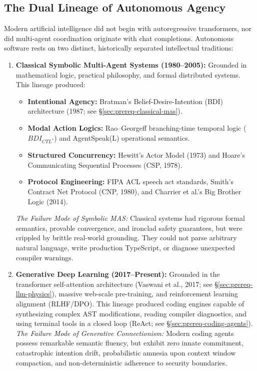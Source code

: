 \subsection{The Dual Lineage of Autonomous Agency}\label{sec:prereq-lineage}

Modern artificial intelligence did not begin with autoregressive transformers, nor did multi-agent coordination originate with chat completions. Autonomous software rests on two distinct, historically separated intellectual traditions:

\begin{enumerate}[leftmargin=1.8em,itemsep=3pt]
  \item \textbf{Classical Symbolic Multi-Agent Systems (1980--2005):} Grounded in mathematical logic, practical philosophy, and formal distributed systems. This lineage produced:
  \begin{itemize}[itemsep=1.5pt]
    \item \textbf{Intentional Agency:} Bratman's Belief-Desire-Intention (BDI) architecture (1987; see \S\ref{sec:prereq-classical-mas}).
    \item \textbf{Modal Action Logics:} Rao--Georgeff branching-time temporal logic ($BDI_{CTL^*}$) and AgentSpeak(L) operational semantics.
    \item \textbf{Structured Concurrency:} Hewitt's Actor Model (1973) and Hoare's Communicating Sequential Processes (CSP, 1978).
    \item \textbf{Protocol Engineering:} FIPA ACL speech act standards, Smith's Contract Net Protocol (CNP, 1980), and Charrier et al.'s Big Brother Logic (2014).
  \end{itemize}
  \emph{The Failure Mode of Symbolic MAS:} Classical systems had rigorous formal semantics, provable convergence, and ironclad safety guarantees, but were crippled by brittle real-world grounding. They could not parse arbitrary natural language, write production TypeScript, or diagnose unexpected compiler warnings.

  \item \textbf{Generative Deep Learning (2017--Present):} Grounded in the transformer self-attention architecture (Vaswani et al., 2017; see \S\ref{sec:prereq-llm-physics}), massive web-scale pre-training, and reinforcement learning alignment (RLHF/DPO). This lineage produced coding engines capable of synthesizing complex AST modifications, reading compiler diagnostics, and using terminal tools in a closed loop (ReAct; see \S\ref{sec:prereq-coding-agents}).
  \emph{The Failure Mode of Generative Connectionism:} Modern coding agents possess remarkable semantic fluency, but exhibit zero innate commitment, catastrophic intention drift, probabilistic amnesia upon context window compaction, and non-deterministic adherence to security boundaries.
\end{enumerate}


